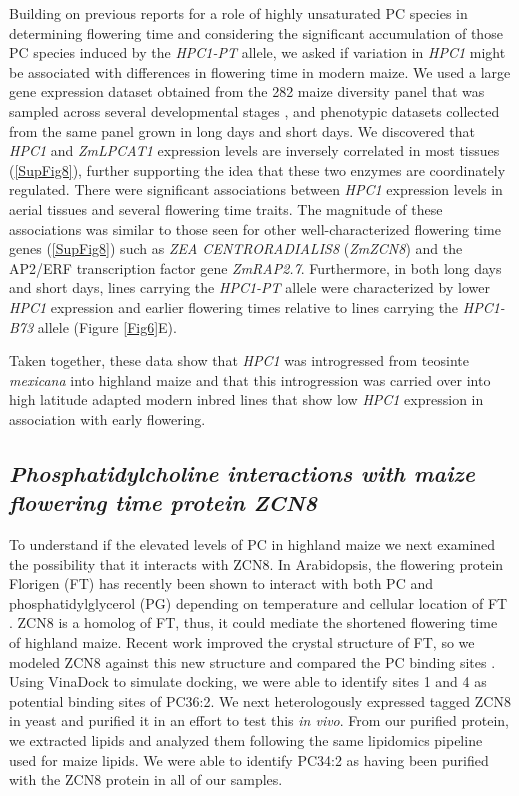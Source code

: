 \documentclass[9pt,twocolumn,twoside,lineno]{biorxiv}
\begin{document}
Building on previous reports for a role of highly unsaturated PC species in determining flowering time \cite{Nakamura2014-qf, Riedelsheimer2013-bd} and considering the significant accumulation of those PC species induced by the \textit{HPC1-PT} allele, we asked if variation in \textit{HPC1} might be associated with differences in flowering time in modern maize. 
We used a large gene expression dataset obtained from the 282 maize diversity panel that was sampled across several developmental stages \cite{Kremling2018-gn}, and phenotypic datasets collected from the same panel grown in long days and short days.
We discovered that \textit{HPC1} and \textit{ZmLPCAT1} expression levels are inversely correlated in most tissues (\ref{SupFig8}), further supporting the idea that these two enzymes are coordinately regulated. 
There were significant associations between \textit{HPC1} expression levels in aerial tissues and several flowering time traits.
The magnitude of these associations was similar to those seen for other well-characterized flowering time genes (\ref{SupFig8}) such as \textit{ZEA CENTRORADIALIS8} (\textit{ZmZCN8})  and the AP2/ERF transcription factor gene \textit{ZmRAP2.7}.  
Furthermore, in both long days and short days, lines carrying the \textit{HPC1-PT} allele were characterized by lower \textit{HPC1} expression and earlier flowering times relative to lines carrying the \textit{HPC1-B73} allele (Figure \ref{Fig6}E). 

Taken together, these data show that \textit{HPC1} was introgressed from teosinte \textit{mexicana} into highland maize and that this introgression was carried over into high latitude adapted modern inbred lines that show low \textit{HPC1} expression in association with early flowering.

\subsection{\textit{Phosphatidylcholine interactions with maize flowering time protein ZCN8}}
To understand if the elevated levels of PC in highland maize we next examined the possibility that it interacts with ZCN8. 
In Arabidopsis, the flowering protein Florigen (FT) has recently been shown to interact with both PC and phosphatidylglycerol (PG) depending on temperature and cellular location of FT \cite{Nakamura2014-qf, Susila2021-dz}.
ZCN8 is a homolog of FT, thus, it could mediate the shortened flowering time of highland maize. 
Recent work improved the crystal structure of FT, so we modeled ZCN8 against this new structure and compared the PC binding sites \cite{Nakamura2019-ht}. 
Using VinaDock to simulate docking, we were able to identify sites 1 and 4 as potential binding sites of PC36:2.
We next heterologously expressed tagged ZCN8 in yeast and purified it in an effort to test this \textit{in vivo}. 
From our purified protein, we extracted lipids and analyzed them following the same lipidomics pipeline used for maize lipids. 
We were able to identify PC34:2 as having been purified with the ZCN8 protein in all of our samples.
\end{document}
